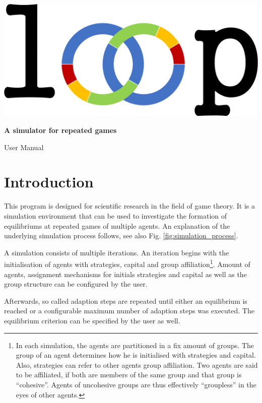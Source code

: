 \documentclass[parskip=full,11pt]{scrartcl}
\begin{document}
\begin{titlepage}
	\centering
	\vspace*{5cm}
	\includegraphics[width = 0.7\linewidth]{img/logo.png}\par
	{\huge\bfseries A simulator for  repeated games\par}
	{\Large User Manual\par}
\end{titlepage}

\tableofcontents
\pagebreak

\section{Introduction}
This program is designed for scientific research in the field of game theory. It is a simulation environment that can be used to investigate the formation of equilibriums at repeated games of multiple agents. An explanation of the underlying simulation process follows, see also Fig. \ref{fig:simulation_process}.

A simulation consists of multiple iterations. An iteration begins with the initialisation of agents with strategies, capital and group affiliation\footnote{In each simulation, the agents are partitioned in a fix amount of groups. The group of an agent determines how he is initialised with strategies and capital. Also, strategies can refer to other agents group affiliation. Two agents are said to be affiliated, if both are members of the same group and that group is \enquote{cohesive}. Agents of uncohesive groups are thus effectively \enquote{groupless} in the eyes of other agents.}. Amount of agents, assignment mechanisms for initials strategies and capital as well as the group structure can be configured by the user.

Afterwards, so called adaption steps are repeated until either an equilibrium is reached or a configurable maximum number of adaption steps was executed. The equilibrium criterion can be specified by the user as well.
\end{document}
